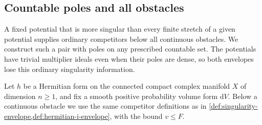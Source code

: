 \subsection{Countable poles and all obstacles}
\label{subsec:countable-pole-obstacles}

A fixed potential that is more singular than every finite stretch of a given potential supplies ordinary competitors below all continuous obstacles. We construct such a pair with poles on any prescribed countable set. The potentials have trivial multiplier ideals even when their poles are dense, so both envelopes lose this ordinary singularity information.

Let $h$ be a Hermitian form on the connected compact complex manifold $X$ of dimension $n\geq1$, and fix a smooth positive probability volume form $\mathrm dV$. Below a continuous obstacle we use the same competitor definitions as in \cref{def:singularity-envelope,def:hermitian-i-envelope}, with the bound $v\leq F$.

